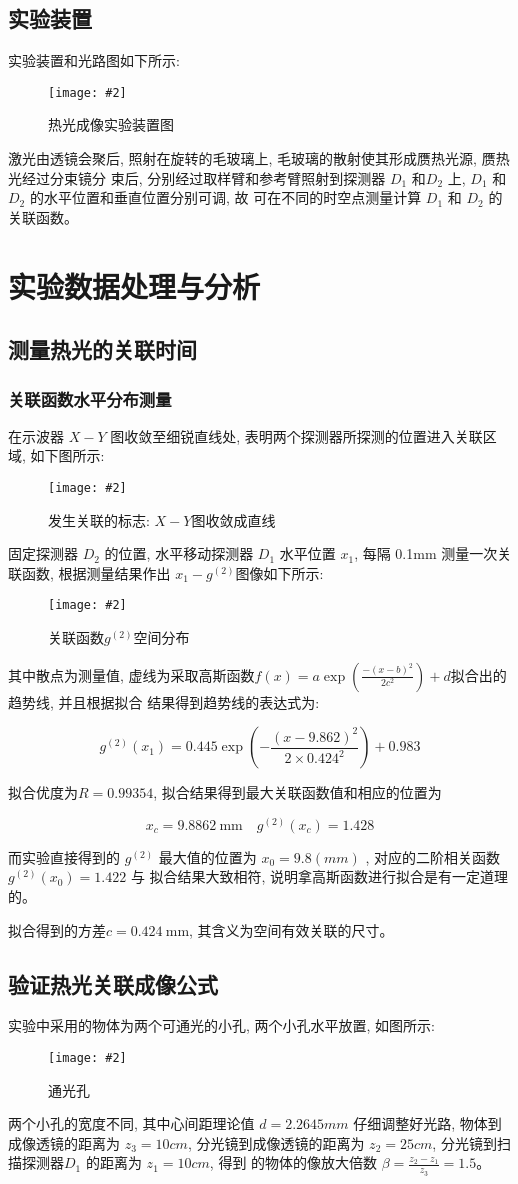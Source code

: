 \documentclass[12pt,a4paper]{article}
\newcommand{\be}[1]{
    \begin{equation}
        #1
    \end{equation}
}
\newcommand{\bfig}[3]{
    \begin{figure}[H]
        \centering
        \texttt{[image: \#2]}
        \caption{#3}
    \end{figure}
}
\begin{document}
\subsection{实验装置}
实验装置和光路图如下所示:
\bfig{0.8}{热光成像实验装置图.png}{热光成像实验装置图}
激光由透镜会聚后, 照射在旋转的毛玻璃上, 毛玻璃的散射使其形成赝热光源, 赝热光经过分束镜分
束后, 分别经过取样臂和参考臂照射到探测器 $D_1$ 和$ D_2$ 上, $D_1$ 和 $D_2$ 的水平位置和垂直位置分别可调, 故
可在不同的时空点测量计算 $D_1$ 和 $D_2$ 的关联函数。
\section{实验数据处理与分析}
\subsection{测量热光的关联时间}
\subsubsection{关联函数水平分布测量}
在示波器 $X − Y$ 图收敛至细锐直线处, 表明两个探测器所探测的位置进入关联区域, 如下图所示: 
\bfig{0.6}{x-y图.jpg}{发生关联的标志: $X-Y$图收敛成直线}
固定探测器 $D_2$ 的位置, 水平移动探测器 $D_1$ 水平位置 $x_1$, 每隔
0.1mm 测量一次关联函数, 根据测量结果作出 $x_1 − g^{(2)}$图像如下所示:
\bfig{0.8}{空间关联.png}{关联函数$g^{(2)}$空间分布}
其中散点为测量值, 虚线为采取高斯函数$f(x)=a \exp \left(\frac{-\left(x-b\right)^{2}}{2 c^{2}}\right)+d$拟合出的趋势线, 并且根据拟合
结果得到趋势线的表达式为:
\be{g^{(2)}(x_1)= 0.445 \exp{(-\frac{(x-9.862)^2}{2 \times  0.424^2})}+0.983}
拟合优度为$R=0.99354$, 拟合结果得到最大关联函数值和相应的位置为
\be{x_{c}=9.8862\mathrm{~mm} \quad g^{(2)}\left(x_{c}\right)=1.428}
而实验直接得到的 $g^{(2)}$ 最大值的位置为 $x_0 = 9.8(mm)$ , 对应的二阶相关函数 $g^{(2)}(x_0) = 1.422$ 与
拟合结果大致相符, 说明拿高斯函数进行拟合是有一定道理的。

拟合得到的方差$c=0.424 \mathrm{~mm}$, 其含义为空间有效关联的尺寸。
\subsection{验证热光关联成像公式}
实验中采用的物体为两个可通光的小孔, 两个小孔水平放置, 如图所示:
\bfig{0.8}{通光孔.jpg}{通光孔}
两个小孔的宽度不同, 其中心间距理论值 $d = 2.2645mm$ 仔细调整好光路, 物体到成像透镜的距离为
$z_3 = 10cm$, 分光镜到成像透镜的距离为 $z_2 = 25cm$, 分光镜到扫描探测器$ D_1$ 的距离为 $z_1 = 10cm$, 得到
的物体的像放大倍数 $\beta =\frac{z_2 − z_1}{z_3}= 1.5$。
\end{document}

